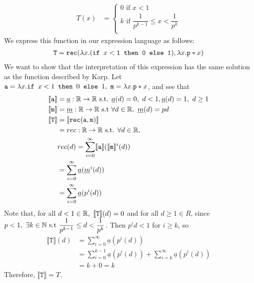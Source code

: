 \begin{align*}
T(x) &= 
 \begin{cases}
 0 \text{ if } x < 1 \\
 k \text{ if }  \dfrac{1}{p^{k-1}} \leq x < \dfrac{1}{p^k} \\
 \end{cases}
 \end{align*}
 We express this function in our expression language as follows: 
 \begin{align*}
 \texttt{T} = \texttt{rec}(\lambda x.(\texttt{if } x<\texttt{1} \texttt{ then } \texttt{0} \texttt{ else } \texttt{1}), \lambda x. \texttt{p}*x)
 \end{align*}
 We want to show that the interpretation of this expression has the same solution as the function described by Karp.
 Let $\texttt{a} = \lambda x.\texttt{if } x<1 \texttt{ then } 0 \texttt{ else } 1, \ \texttt{m} = \lambda x.\texttt{p}*x$, and see that
 \begin{align*}
  \llbracket \texttt{a} \rrbracket &= \underline{a} : \mathbb{R} \rightarrow \mathbb{R} \text{ s.t. } \underline{a}(d) = 0, 
  \ d<1, \underline{a}(d) = 1, \ d \geq 1  \\
 \llbracket \texttt{m} \rrbracket &= \underline{m} : \mathbb{R} \rightarrow \mathbb{R} \text{ s.t } \forall d \in \mathbb{R}, \
 \underline{m}(d) = pd \\
 \llbracket \texttt{T} \rrbracket&= \llbracket \texttt{rec}(\texttt{a}, \texttt{m}) \rrbracket \\
 &= rec: \mathbb{R} \rightarrow \mathbb{R} \text{ s.t. } \forall d \in \mathbb{R}, \\
 &rec(d) = \sum_{i=0}^{\infty}\llbracket \texttt{a} \rrbracket (\llbracket \texttt{m} \rrbracket^i(d)) \\
 &= \sum_{i=0}^{\infty}\underline{a} (\underline{m}^i(d)) \\
 &= \sum_{i=0}^{\infty}\underline{a} (p^i(d))
 \end{align*}
Note that, for all $ d<1 \in \mathbb{R}, \ \llbracket \texttt{T} \rrbracket(d) = 0$
and for all $d \geq 1 \in R$, since $p < 1, \ \exists k \in \mathbb{N} \text{ s.t } \dfrac{1}{p^{k-1}} \leq d < \dfrac{1}{p^k}$. Then
$p^id < 1$ for $i \geq k$, so
\begin{align*}
\llbracket \texttt{T} \rrbracket(d)&= \sum_{i=0}^{\infty}\underline{a} (p^i(d)) \\
&= \sum_{i=0}^{k-1}\underline{a} (p^i(d)) + \sum_{i=k}^{\infty}\underline{a} (p^i(d)) \\
&= k + 0 = k
\end{align*}
Therefore, $\llbracket \texttt{T} \rrbracket = T$.
 

